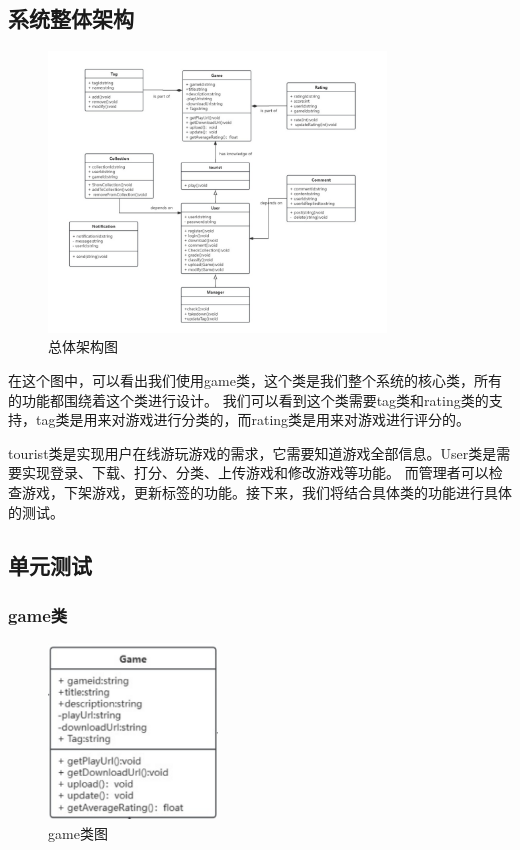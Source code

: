 \documentclass[12pt]{ctexart} %
\begin{document}
\subsection{系统整体架构}

  \begin{figure}[H] %
      \centering %
      \includegraphics[width=0.8\textwidth]{./images/class.png} %
      \caption{总体架构图} %
  \end{figure}

在这个图中，可以看出我们使用game类，这个类是我们整个系统的核心类，所有的功能都围绕着这个类进行设计。
我们可以看到这个类需要tag类和rating类的支持，tag类是用来对游戏进行分类的，而rating类是用来对游戏进行评分的。

tourist类是实现用户在线游玩游戏的需求，它需要知道游戏全部信息。User类是需要实现登录、下载、打分、分类、上传游戏和修改游戏等功能。
而管理者可以检查游戏，下架游戏，更新标签的功能。接下来，我们将结合具体类的功能进行具体的测试。

\subsection{单元测试}

\subsubsection{game类}
  \begin{figure}[H] %
      \centering %
      \includegraphics[width=0.4\textwidth]{./images/game.png} %
      \caption{game类图} %
  \end{figure}
\end{document}
